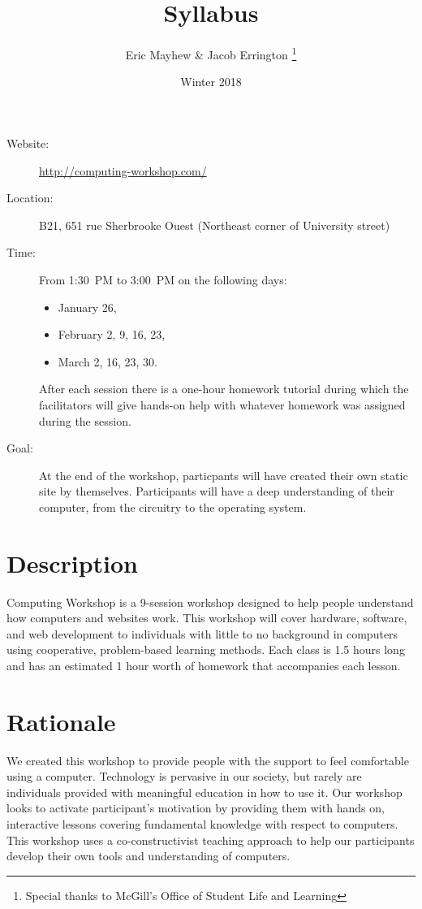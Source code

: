 \documentclass[11pt]{article}
\author{%
  Eric Mayhew \& Jacob Errington%
  \footnote{Special thanks to McGill's Office of Student Life and Learning}
}
\title{Syllabus}
\date{Winter 2018}
\begin{document}
\maketitle

\begin{description}
  \item[Website:]
    \url{http://computing-workshop.com/}

  \item[Location:]
    B21, 651 rue Sherbrooke Ouest
    (Northeast corner of University street)

  \item[Time:]
    From 1:30~PM to 3:00~PM on the following days:
    \begin{itemize}
      \item January 26,
      \item February 2, 9, 16, 23,
      \item March 2, 16, 23, 30.
    \end{itemize}

    After each session there is a one-hour homework tutorial during which the
    facilitators will give hands-on help with whatever homework was assigned
    during the session.

  \item[Goal:]
    At the end of the workshop, particpants will have created their own static
    site by themselves. Participants will have a deep understanding of their
    computer, from the circuitry to the operating system.
\end{description}

\section*{Description}

Computing Workshop is a 9-session workshop designed to help people understand
how computers and websites work. This workshop will cover hardware, software,
and web development to individuals with little to no background in computers
using cooperative, problem-based learning methods. Each class is 1.5 hours long
and has an estimated 1 hour worth of homework that accompanies each lesson.

\section*{Rationale}

We created this workshop to provide people with the support to feel comfortable
using a computer. Technology is pervasive in our society, but rarely are
individuals provided with meaningful education in how to use it. Our workshop
looks to activate participant's motivation by providing them with hands on,
interactive lessons covering fundamental knowledge with respect to computers.
This workshop uses a co-constructivist teaching approach to help our
participants develop their own tools and understanding of computers.
\end{document}
